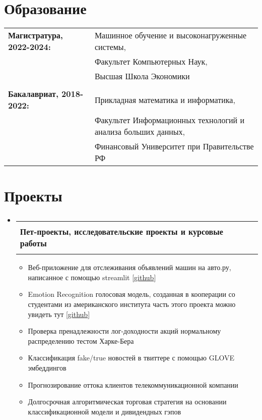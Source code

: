 \documentclass[letterpaper,10pt]{article}
\makeatletter
\newcommand{\resumeProjSubheading}[5]{
  \vspace{-10pt}\item
    \begin{tabular*}{0.97\textwidth}{l@{\extracolsep{\fill}}r}
      \vspace{2pt} \textbf{#1}  & \textcolor{mygray}{\small #2} \\
      \textbf{#3} & \textcolor{mygray}{\textit{\small #4}} \\
      {\scriptsize#5}
    \end{tabular*}\vspace{3pt}
}
\newcommand{\resumeSubHeadingListStart}{\begin{itemize}[leftmargin=*]}
\newcommand{\resumeSubHeadingListEnd}{\end{itemize}}
\newcommand{\resumeDesc}[1]{\begin{adjustwidth}{5pt}{0pt}\vspace{-2pt}{#1}\end{adjustwidth}}
\makeatother
\begin{document}
\section{Образование}
 \resumeSubHeadingListStart
 \begin{tabular}{ll}
 \textbf{Магистратура, 2022-2024:} & \quad Машинное обучение и высоконагруженные системы, \break \\
\textbf{} & \quad Факультет Компьютерных Наук, \break \\
\textbf{} & \quad Высшая Школа Экономики \\
\textbf{} & \quad \\
\textbf{Бакалавриат, 2018-2022:} & \quad Прикладная математика и информатика, \break \\
\textbf{} & \quad Факультет Информационных технологий и анализа больших данных, \break \\
\textbf{} & \quad Финансовый Университет при Правительстве РФ \\


\end{tabular}
 \resumeSubHeadingListEnd

  
\section{Проекты}
  \resumeSubHeadingListStart
      \resumeProjSubheading
      {}{}{{Пет-проекты, исследовательские проекты и курсовые работы}}{}

          \resumeDesc{
          \begin{itemize}
              \item Веб-приложение для отслеживания объявлений машин на авто.ру, написанное с помощью streamlit [\href{https://github.com/orson88/micro_autoru_app}{github}]
              \item Emotion Recognition голосовая модель, созданная в кооперации со студентами из американского института \break
              часть этого проекта можно увидеть тут [\href{https://github.com/orson88/TeleMedicineShowcase}{github}]
              \item Проверка пренадлежности лог-доходности акций нормальному распределению тестом Харке-Бера
              \item Классификация fake/true новостей в твиттере с помощью GLOVE эмбеддингов
              \item Прогнозирование оттока клиентов телекоммуникационной компании
              \item Долгосрочная алгоритмическая торговая стратегия на основании классификационной модели и дивидендных гэпов
          \end{itemize}
          }
          

  \resumeSubHeadingListEnd
\end{document}
